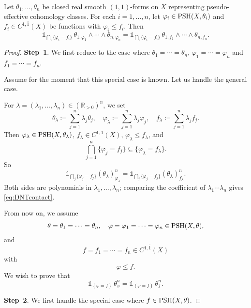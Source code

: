 \begin{theorem}\label{thm:DNTcontact}
Let $\theta_1,\dots,\theta_n$ be closed real smooth $(1,1)$-forms on $X$ representing pseudo-effective cohomology classes. For each $i=1,\dots,n$, let $\varphi_i\in\mathrm{PSH}(X,\theta_i)$ and $f_i\in C^{1,\overline{1}}(X)$ be functions with $\varphi_i\leq f_i$. Then
\begin{equation}\label{eq:DNTcontact}
\mathds{1}_{\bigcap_i\{\varphi_i=f_i\}}\, \theta_{1,\varphi_1}\wedge\cdots\wedge\theta_{n,\varphi_n} = \mathds{1}_{\bigcap_i\{\varphi_i=f_i\}}\, \theta_{1,f_1}\wedge\cdots\wedge\theta_{n,f_n}.
\end{equation}
\end{theorem}

\begin{proof}
    \textbf{Step~1}. We first reduce to the case where $\theta_1=\cdots=\theta_n$, $\varphi_1=\cdots=\varphi_n$ and $f_1=\cdots=f_n$.

    Assume for the moment that this special case is known. Let us handle the general case.

    For $\lambda=(\lambda_1,\dots,\lambda_n)\in(\mathbb{R}_{>0})^n$, we set
    \[
    \theta_\lambda\coloneqq \sum_{j=1}^n\lambda_j\theta_j,\quad \varphi_\lambda\coloneqq \sum_{j=1}^n\lambda_j\varphi_j,\quad f_\lambda\coloneqq \sum_{j=1}^n\lambda_j f_j.
    \]
    Then $\varphi_\lambda\in\mathrm{PSH}(X,\theta_\lambda)$, $f_\lambda\in C^{1,\overline{1}}(X)$, $\varphi_\lambda\leq f_\lambda$, and
    \[
        \bigcap_{j=1}^n\{\varphi_j=f_j\}\subseteq\{\varphi_\lambda=f_\lambda\}.
    \]
    So
    \[
        \mathds{1}_{\bigcap_j\{\varphi_j=f_j\}}(\theta_\lambda)^n_{\varphi_\lambda} = \mathds{1}_{\bigcap_j\{\varphi_j=f_j\}}(\theta_\lambda)^n_{f_\lambda}.
    \]
Both sides are polynomials in $\lambda_1,\dots,\lambda_n$; comparing the coefficient of $\lambda_1\cdots\lambda_n$ gives \eqref{eq:DNTcontact}.

From now on, we assume
\[
\theta=\theta_1=\dots=\theta_n,\quad
\varphi=\varphi_1=\cdots=\varphi_n\in \mathrm{PSH}(X,\theta),
\]
and
\[
f=f_1=\cdots=f_n\in C^{1,\overline{1}}(X)
\]
with
\[
\varphi\leq f.
\]
We wish to prove that
\begin{equation}\label{eq:DNT_temp1}
    \mathds{1}_{\left\{\varphi=f\right\}}\,\theta_{\varphi}^n=\mathds{1}_{\left\{\varphi=f\right\}}\,\theta_{f}^n.
\end{equation}

\textbf{Step~2}. We first handle the special case where $f\in \mathrm{PSH}(X,\theta)$.


\end{proof}
